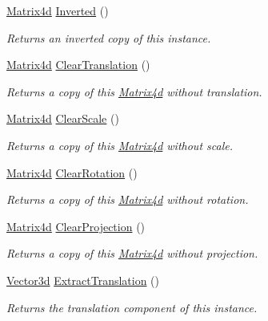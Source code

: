 \begin{DoxyCompactItemize}
\hyperlink{struct_open_t_k_1_1_matrix4d}{Matrix4d} \hyperlink{struct_open_t_k_1_1_matrix4d_ad11fea78f9c04510a59583e5ef82e6da}{Inverted} ()
\begin{DoxyCompactList}\small\item\em Returns an inverted copy of this instance. \end{DoxyCompactList}\item 
\hyperlink{struct_open_t_k_1_1_matrix4d}{Matrix4d} \hyperlink{struct_open_t_k_1_1_matrix4d_ad50d679517a386728ba26829f2b17614}{Clear\-Translation} ()
\begin{DoxyCompactList}\small\item\em Returns a copy of this \hyperlink{struct_open_t_k_1_1_matrix4d}{Matrix4d} without translation. \end{DoxyCompactList}\item 
\hyperlink{struct_open_t_k_1_1_matrix4d}{Matrix4d} \hyperlink{struct_open_t_k_1_1_matrix4d_afb8bfc9b5683b844073d1d5a0c772425}{Clear\-Scale} ()
\begin{DoxyCompactList}\small\item\em Returns a copy of this \hyperlink{struct_open_t_k_1_1_matrix4d}{Matrix4d} without scale. \end{DoxyCompactList}\item 
\hyperlink{struct_open_t_k_1_1_matrix4d}{Matrix4d} \hyperlink{struct_open_t_k_1_1_matrix4d_afe1700dd3ae008354e20bb5a6d314885}{Clear\-Rotation} ()
\begin{DoxyCompactList}\small\item\em Returns a copy of this \hyperlink{struct_open_t_k_1_1_matrix4d}{Matrix4d} without rotation. \end{DoxyCompactList}\item 
\hyperlink{struct_open_t_k_1_1_matrix4d}{Matrix4d} \hyperlink{struct_open_t_k_1_1_matrix4d_a9f1a4329522a901a869d832c9b276e0d}{Clear\-Projection} ()
\begin{DoxyCompactList}\small\item\em Returns a copy of this \hyperlink{struct_open_t_k_1_1_matrix4d}{Matrix4d} without projection. \end{DoxyCompactList}\item 
\hyperlink{struct_open_t_k_1_1_vector3d}{Vector3d} \hyperlink{struct_open_t_k_1_1_matrix4d_af25cefd5e374b09f482b89911e6367b9}{Extract\-Translation} ()
\begin{DoxyCompactList}\small\item\em Returns the translation component of this instance. \end{DoxyCompactList}\item 

\end{DoxyCompactItemize}
